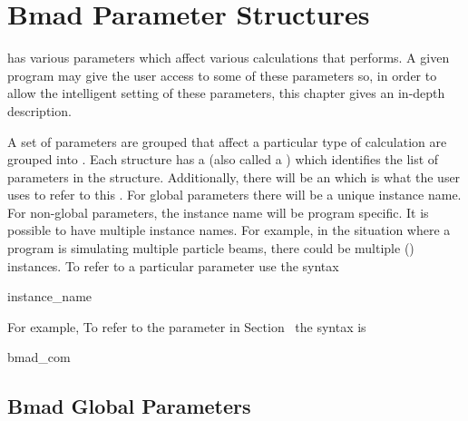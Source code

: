 \chapter{Bmad Parameter Structures}

\bmad has various parameters which affect various
calculations that \bmad performs. A given program may give the user
access to some of these parameters so, in order to allow the intelligent
setting of these parameters, this chapter gives an in-depth description.

A set of parameters are grouped that affect a particular type of
calculation are grouped into . Each structure has a
 (also called a ) which
identifies the list of parameters in the structure.  Additionally,
there will be an  which is what the user uses to
refer to this . For global parameters there will be a
unique instance name.  For non-global parameters, the instance name
will be program specific.  It is possible to have multiple instance
names. For example, in the situation where a program is simulating
multiple particle beams, there could be multiple 
() instances.  To refer to a particular parameter
use the syntax
\begin{example}
  instance_name%
\end{example}
For example, To refer to the  parameter in
Section~ the syntax is
\begin{example}
  bmad_com%
\end{example}

\section{Bmad Global Parameters}
\label{s:bmad.params}


